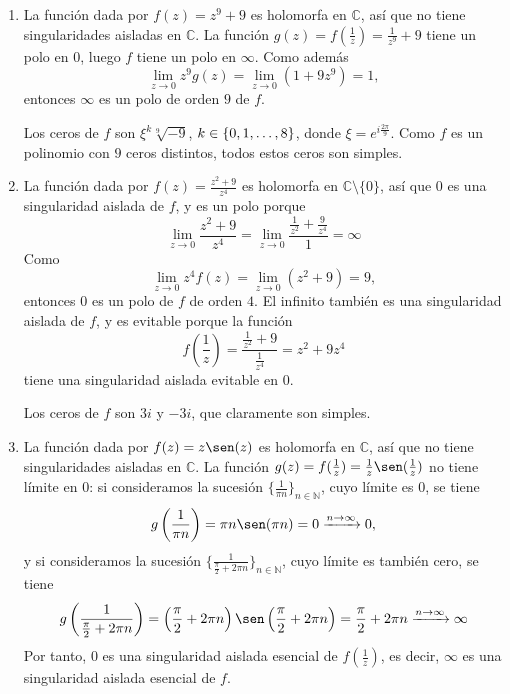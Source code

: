 \documentclass[11pt]{report}
\makeatletter
\renewenvironment{proof}[1][\proofname]{\par
  \pushQED{\qed}%
  \normalfont \topsep\z@skip %
  \trivlist
  \item[\hskip\labelsep
        \itshape
    #1\@addpunct{.}]\ignorespaces
}{%
  \popQED\endtrivlist\@endpefalse
}
\newcommand{\N}{\mathbb N}
\newcommand{\C}{\mathbb C}
\makeatother
\begin{document}
\begin{proof}
  \hfill
  \begin{enumerate}
    \item La función dada por $f(z)=z^9+9$ es holomorfa en $\C$, así que no tiene singularidades aisladas en $\C$. La función $g(z)=f(\frac{1}{z}) = \frac{1}{z^9}+9$ tiene un polo en $0$, luego $f$ tiene un polo en $\infty$. Como además
    \[\lim_{z \to 0}z^9g(z) = \lim_{z \to 0} (1+9z^9) = 1,\]
    entonces $\infty$ es un polo de orden $9$ de $f$. 
    
    Los ceros de $f$ son $\xi^k\sqrt[9]{-9}$, $k \in \{0,1,\mathellipsis,8\}$, donde $\xi = e^{i\frac{2\pi}{9}}$. Como $f$ es un polinomio con $9$ ceros distintos, todos estos ceros son simples.
    \item La función dada por $f(z)=\frac{z^2+9}{z^4}$ es holomorfa en $\C \setminus \{0\}$, así que $0$ es una singularidad aislada de $f$, y es un polo porque
    \[\lim_{z \to 0} \frac{z^2+9}{z^4} = \lim_{z \to 0} \frac{\frac{1}{z^2}+\frac{9}{z^4}}{1} = \infty\]
    Como
    \[\lim_{z \to 0} z^4f(z)=\lim_{z \to 0} (z^2+9) = 9,\]
    entonces $0$ es un polo de $f$ de orden $4$. El infinito también es una singularidad aislada de $f$, y es evitable porque la función \[f\left(\frac{1}{z}\right) = \frac{\frac{1}{z^2}+9}{\frac{1}{z^4}} = z^2+9z^4\]
    tiene una singularidad aislada evitable en $0$. 
    
    Los ceros de $f$ son $3i$ y $-3i$, que claramente son simples.
    \item La función dada por $f(z)=z\sen(z)$ es holomorfa en $\C$, así que no tiene singularidades aisladas en $\C$. La función $g(z)=f(\frac{1}{z}) = \frac{1}{z}\sen(\frac{1}{z})$ no tiene límite en $0$: si consideramos la sucesión $\{\frac{1}{\pi n}\}_{n \in \N}$, cuyo límite es $0$, se tiene
    \[g\left(\frac{1}{\pi n}\right) = \pi n\sen(\pi n) = 0 \xrightarrow[]{n \to \infty} 0,\] 
    y si consideramos la sucesión $\{\frac{1}{\frac{\pi}{2}+2\pi n}\}_{n \in \N}$, cuyo límite es también cero, se tiene
    \[g\left(\frac{1}{\frac{\pi}{2}+2\pi n}\right) = \left(\frac{\pi}{2}+2\pi n\right)\sen\left(\frac{\pi}{2}+2\pi n\right)= \frac{\pi}{2}+2\pi n \xrightarrow[]{n \to \infty} \infty\] 
    Por tanto, $0$ es una singularidad aislada esencial de $f(\frac{1}{z})$, es decir, $\infty$ es una singularidad aislada esencial de $f$. 
    

\end{enumerate}
\end{proof}
\end{document}
